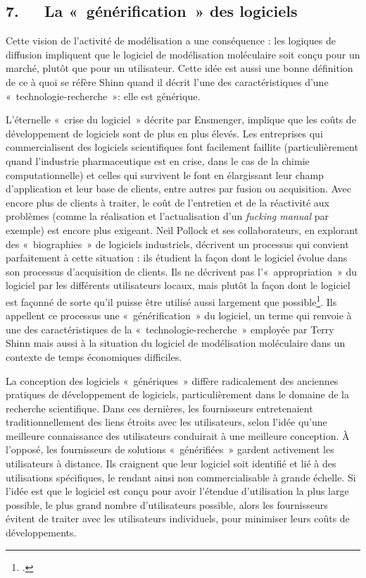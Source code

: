 \documentclass{FramateX}
\begin{document}
\begin{refsection}
\section*{7.~~~La «~générification~» des logiciels}
{}

Cette vision de l'activité de modélisation a une
conséquence : les logiques de diffusion impliquent que le logiciel de
modélisation moléculaire soit conçu pour un marché, plutôt que pour un
utilisateur. Cette idée est aussi une bonne définition de ce à quoi se
réfère Shinn quand il décrit l'une des
caractéristiques d'une «~technologie-recherche~»: elle
est générique.

L'éternelle «~crise du logiciel~» décrite par
Ensmenger, implique que les coûts de développement de logiciels sont de
plus en plus élevés. Les entreprises qui commercialisent des logiciels
scientifiques font facilement faillite (particulièrement quand
l'industrie pharmaceutique est en crise, dans le cas
de la chimie computationnelle) et celles qui survivent le font en
élargissant leur champ d'application et leur base de
clients, entre autres par fusion ou acquisition. Avec encore plus de
clients à traiter, le coût de l'entretien et de la
réactivité aux problèmes (comme la réalisation et
l'actualisation d'un
\textit{fucking manual} par exemple) est encore plus exigeant. Neil
Pollock et ses collaborateurs, en explorant des «~biographies~» de
logiciels industriels, décrivent un processus qui convient parfaitement
à cette situation : ils étudient la façon dont le logiciel évolue dans
son processus d'acquisition de clients. Ils ne
décrivent pas l'«~appropriation~» du logiciel par les
différents utilisateurs locaux, mais plutôt la façon dont le logiciel
est façonné de sorte qu'il puisse être utilisé aussi
largement que possible\footnote{\cite{Pollock2007}.}. Ils appellent ce processus une «~générification~» du logiciel, un terme qui renvoie à une des
caractéristiques de la «~technologie-recherche~» employée par Terry Shinn
mais aussi à la situation du logiciel de modélisation moléculaire dans
un contexte de temps économiques difficiles.

La conception des logiciels «~génériques~» diffère radicalement des
anciennes pratiques de développement de logiciels, particulièrement
dans le domaine de la recherche scientifique. Dans ces dernières, les
fournisseurs entretenaient traditionnellement des liens étroits avec
les utilisateurs, selon l'idée qu'une
meilleure connaissance des utilisateurs conduirait à une meilleure
conception. À l'opposé, les fournisseurs de solutions
«~générifiées~» gardent activement les utilisateurs à distance. Ils
craignent que leur logiciel soit identifié et lié à des utilisations
spécifiques, le rendant ainsi non commercialisable à grande échelle. Si
l'idée est que le logiciel est conçu pour avoir
l'étendue d'utilisation la plus large
possible, le plus grand nombre d'utilisateurs
possible, alors les fournisseurs évitent de traiter avec les
utilisateurs individuels, pour minimiser leurs coûts de développements.


\end{refsection}
\end{document}
